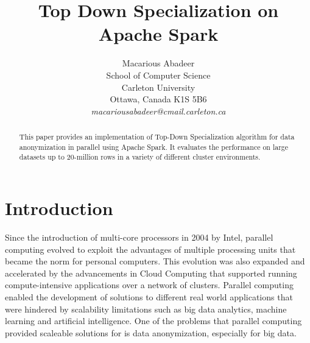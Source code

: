 \documentclass[11pt]{article}       %
\begin{document}


\title{Top Down Specialization on Apache Spark\texttrademark}


\author{
Macarious Abadeer\\
School of Computer Science\\
Carleton University\\
Ottawa, Canada K1S 5B6\\
{\em macariousabadeer@cmail.carleton.ca}
} %

\maketitle

\begin{abstract}
This paper provides an implementation of Top-Down Specialization algorithm for data anonymization in parallel using Apache Spark. It evaluates the performance on large datasets up to 20-million rows in a variety of different cluster environments.
\end{abstract}


\section{Introduction} \label{intro}

Since the introduction of multi-core processors in 2004 by Intel\textsuperscript{\textregistered}, parallel computing evolved to exploit the advantages of multiple processing units that became the norm for personal computers. This evolution was also expanded and accelerated by the advancements in Cloud Computing that supported running compute-intensive applications over a network of clusters. Parallel computing enabled the development of solutions to different real world applications that were hindered by scalability limitations such as big data analytics, machine learning and artificial intelligence. One of the problems that parallel computing provided scaleable solutions for is data anonymization, especially for big data. 
\end{document}
